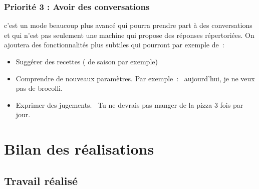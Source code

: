 \documentclass{report}
\begin{document}
\subsubsection{Priorité 3 : Avoir des conversations } c'est un mode beaucoup plus avancé qui pourra prendre part à des conversations et qui n'est pas seulement une machine qui propose des réponses répertoriées. On ajoutera des fonctionnalités plus subtiles qui pourront par exemple de :
\begin{itemize}
\item Suggérer des recettes ( de saison par exemple)
\item Comprendre de nouveaux paramètres. Par exemple : \og aujourd'hui, je ne veux pas de brocolli. \fg{}
\item Exprimer des jugements. \og Tu ne devrais pas manger de la pizza 3 fois par jour.\fg{}
\end{itemize}
\section{Bilan des réalisations}
\subsection{Travail réalisé}
\end{document}
